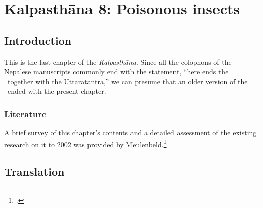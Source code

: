 \chapter{Kalpasthāna 8: Poisonous insects}

\section{Introduction} 

This is the last chapter of the \emph{Kalpasthāna}.  Since all the  colophons 
of the Nepalese manuscripts commonly end with the statement, “here ends 
the \SS\ together with the Uttaratantra,” we can presume that an older 
version of the \SS\ ended with the present chapter.
    
    

\subsection{Literature} 
A brief survey of this chapter's contents and a detailed assessment of
the existing research on it to 2002 was provided by
Meulenbeld.\footcite[IA, 296--299]{meul-hist} 


\section{Translation}



